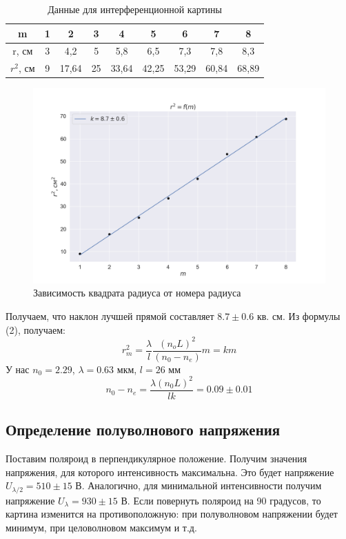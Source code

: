 \documentclass[a4paper, 12pt]{article}
\begin{document}
\begin{table}[H]
	\centering
	\begin{tabular}{|c|c|c|c|c|c|c|c|c|}
	\hline
	m         & 1 & 2     & 3  & 4     & 5     & 6     & 7     & 8     \\ \hline
	r, см     & 3 & 4,2   & 5  & 5,8   & 6,5   & 7,3   & 7,8   & 8,3   \\ \hline
	$r^2$, см & 9 & 17,64 & 25 & 33,64 & 42,25 & 53,29 & 60,84 & 68,89 \\ \hline
	\end{tabular}
	\caption{Данные для интерференционной картины}
	\label{tab:data1}
\end{table}
\begin{figure}[H]
    \centering
    \includegraphics[width=1\textwidth]{plot1.png}
    \caption{Зависимость квадрата радиуса от номера радиуса}
    \label{fig:plot1}
\end{figure}
Получаем, что наклон лучшей прямой составляет $8.7 \pm 0.6$ кв. см. Из формулы (2), получаем:
\begin{equation}
	r_m^2=\frac{\lambda}{l} \frac{\left(n_o L\right)^2}{\left(n_0-n_e\right)} m = km
\end{equation}
У нас $n_0 = 2.29$, $\lambda = 0.63$ мкм, $l = 26$ мм
\begin{equation}
	n_0 - n_e = \frac{\lambda (n_0 L)^2}{lk} = 0.09 \pm 0.01
\end{equation}
\subsection*{Определение полуволнового напряжения}
Поставим поляроид в перпендикулярное положение. Получим значения напряжения, для которого интенсивность максимальна. Это будет напряжение $U_{\lambda/2} = 510 \pm 15$ В. Аналогично, для минимальной интенсивности получим напряжение $U_{\lambda} = 930 \pm 15$ В.
Если повернуть поляроид на 90 градусов, то картина изменится на противоположную: при полуволновом напряжении будет минимум, при целоволновом максимум и т.д.
\end{document}
